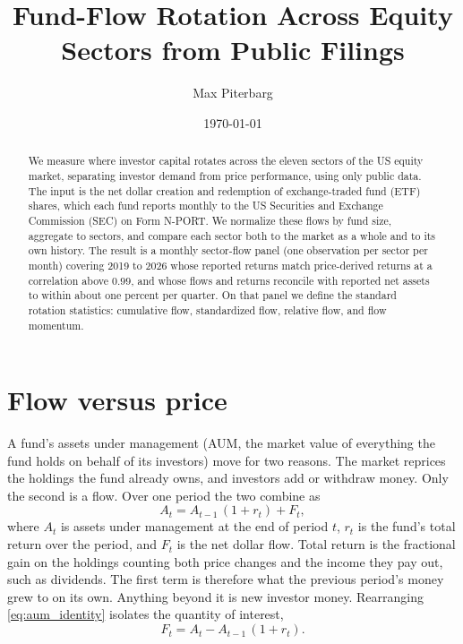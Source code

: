 \documentclass[11pt]{article}
\title{Fund-Flow Rotation Across Equity Sectors from Public Filings}
\author{Max Piterbarg}
\date{\today}
\begin{document}
\maketitle

\begin{abstract}
We measure where investor capital rotates across the eleven sectors of the US equity
market, separating investor demand from price performance, using only public data. The
input is the net dollar creation and redemption of exchange-traded fund (ETF) shares,
which each fund reports monthly to the US Securities and Exchange Commission (SEC) on
Form N-PORT. We normalize these flows by fund size, aggregate to sectors, and compare
each sector both to the market as a whole and to its own history. The result is a
monthly sector-flow panel (one observation per sector per month) covering 2019 to 2026 whose
reported returns match price-derived returns at a correlation above $0.99$, and whose
flows and returns reconcile with reported net assets to within about one percent per
quarter. On that panel we define the standard rotation statistics: cumulative flow,
standardized flow, relative flow, and flow momentum.
\end{abstract}

\section{Flow versus price}
\label{sec:flow-vs-price}

A fund's assets under management (AUM, the market value of everything the fund holds on
behalf of its investors) move for two reasons. The market reprices the holdings the fund
already owns, and investors add or withdraw money. Only the second is a flow. Over one
period the two combine as
\begin{equation}
\label{eq:aum_identity}
A_t = A_{t-1}\,(1 + r_t) + F_t,
\end{equation}
where $A_t$ is assets under management at the end of period $t$, $r_t$ is the fund's
total return over the period, and $F_t$ is the net dollar flow. Total return is the
fractional gain on the holdings counting both price changes and the income they pay out,
such as dividends. The first term is therefore what the previous period's money grew to
on its own. Anything beyond it is new investor money.
Rearranging \eqref{eq:aum_identity} isolates the quantity of interest,
\begin{equation}
\label{eq:flow_residual}
F_t = A_t - A_{t-1}\,(1 + r_t).
\end{equation}
\end{document}
